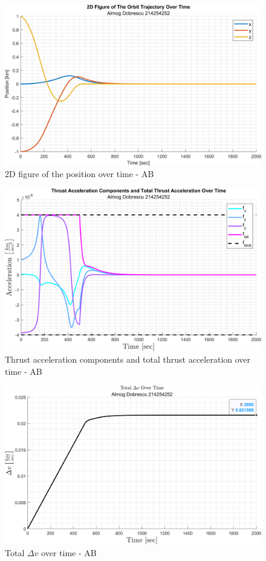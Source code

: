 \documentclass[11pt, a4paper]{article}
\begin{document}
\begin{figure}[H]
    \centering
    \includegraphics[width=1\textwidth]{images/graph2.png}
    \caption{2D figure of the position over time - AB}
    \label{fig:2D-plot_over_time-AB}
\end{figure}
\begin{figure}[H]
    \centering
    \includegraphics[width=1\textwidth]{images/graph3.png}
    \caption{Thrust acceleration components and total thrust acceleration over time - AB}
    \label{fig:accel_over_time-AB}
\end{figure}
\begin{figure}[H]
    \centering
    \includegraphics[width=1\textwidth]{images/graph4.png}
    \caption{Total $\Delta v$ over time - AB}
    \label{fig:delta_v_over_time-AB}
\end{figure}
\end{document}
